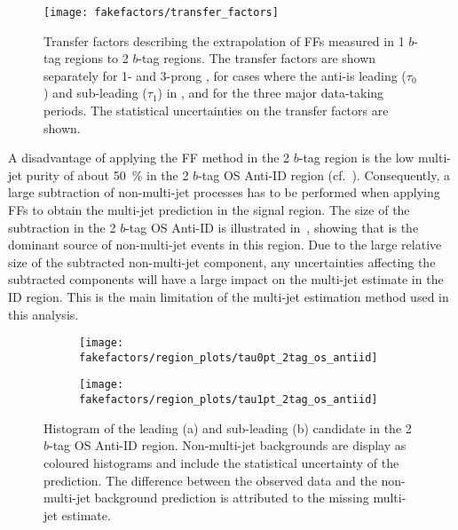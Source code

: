 \begin{figure}[htbp]
  \centering

  \texttt{[image: fakefactors/transfer\_factors]}

  \caption{Transfer factors describing the extrapolation of FFs measured in 1
    $b$-tag regions to 2 $b$-tag regions. The transfer factors are shown
    separately for 1- and 3-prong \tauhadvis, for cases where the
    anti-\tauhadvis is leading ($\tau_0$) and sub-leading ($\tau_1$) in \pT, and
    for the three major data-taking periods.  The statistical uncertainties on
    the transfer factors are shown.}%
  \label{fig:mjfakes_transfer_factor}
\end{figure}

A disadvantage of applying the FF method in the 2 $b$-tag region is the low
multi-jet purity of about \SI{50}{\percent} in the 2 $b$-tag OS Anti-ID region
(cf.\ ). Consequently, a large subtraction of
non-multi-jet processes has to be performed when applying FFs to obtain the
multi-jet prediction in the signal region.  The size of the subtraction in the 2
$b$-tag OS Anti-ID is illustrated in~, showing
that \ttbarFakes is the dominant source of non-multi-jet events in this
region. Due to the large relative size of the subtracted non-multi-jet
component, any uncertainties affecting the subtracted components will have a
large impact on the multi-jet estimate in the ID region. This is the main
limitation of the multi-jet estimation method used in this analysis.

\begin{figure}[htbp]
  \centering

  \begin{subfigure}{0.49\textwidth}
    \texttt{[image: fakefactors/region\_plots/tau0pt\_2tag\_os\_antiid]}
    \subcaption{}
  \end{subfigure}
  \begin{subfigure}{0.49\textwidth}
    \texttt{[image: fakefactors/region\_plots/tau1pt\_2tag\_os\_antiid]}
    \subcaption{}
  \end{subfigure}

  \caption{Histogram of the leading (a) and sub-leading (b) \tauhadvis candidate
    \pT in the 2 $b$-tag OS Anti-ID region. Non-multi-jet backgrounds are
    display as coloured histograms and include the statistical uncertainty of
    the prediction. The difference between the observed data and the
    non-multi-jet background prediction is attributed to the missing multi-jet
    estimate.}%
  \label{fig:mjfakes_2tag_os_antiid}
\end{figure}



